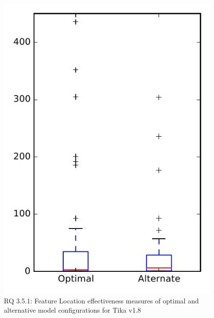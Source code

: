 
\begin{figure}
\centering
\includegraphics[height=0.4\textheight]{figures/combo/flt_rq1_tika}
\caption{RQ 3.5.1: Feature Location effectiveness measures of optimal and alternative model configurations for Tika v1.8}
\label{fig:combo:flt:rq1:tika}
\end{figure}
